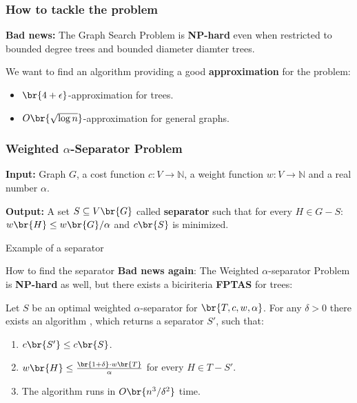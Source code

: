 \begin{frame}
\frametitle{How to tackle the problem}
\textbf{Bad news:}
The Graph Search Problem is \textbf{NP-hard} even when restricted to bounded degree trees and bounded diameter diamter trees. 
\pause

We want to find an algorithm providing a good \textbf{approximation} for the problem:
\begin{itemize}
    \item $\br{4+\epsilon}$-approximation for trees.
    \item $O\br{\sqrt{\log n}}$-approximation for general graphs.
\end{itemize}
\end{frame}

\begin{frame}
\frametitle{Weighted $\alpha$-Separator Problem}
\begin{tcolorbox}[colback=white, title=Weighted $\alpha$-Separator Problem, fonttitle=\bfseries, breakable]
\textbf{Input:} Graph $G$, a cost function $c:V\to \mathbb{N}$, a weight function $w:V\to \mathbb{N}$ and a real number $\alpha$.

\pause
\textbf{Output:} A set $S\subseteq V\br{G}$ called \textbf{separator} such that for every $H\in G-S$: $w\br{H}\leq w\br{G}/\alpha$ and $c\br{S}$ is minimized.
\end{tcolorbox}

\end{frame}

\begin{frame}{Example of a separator}
    
\end{frame}

\begin{frame}{How to find the separator}
\textbf{Bad news again}: The Weighted $\alpha$-separator Problem is \textbf{NP-hard} as well, but there exists a biciriteria \textbf{FPTAS} for trees:
\pause
\begin{theorem}
    Let $S$ be an optimal weighted $\alpha$-separator for $\br{T,c,w,\alpha}$. For any $\delta>0$ there exists an algorithm \FSeparatorFPTAS, which returns a separator $S'$, such that:
    \begin{enumerate}
        \item $c\br{S'}\leq c\br{S}$.
        \item $w\br{H}\leq \frac{\br{1+\delta}\cdot w\br{T}}{\alpha}$ for every $H\in T-S'$.
        \item The algorithm runs in $O\br{n^3/\delta^2}$ time.
    \end{enumerate}
\end{theorem}

\end{frame}

